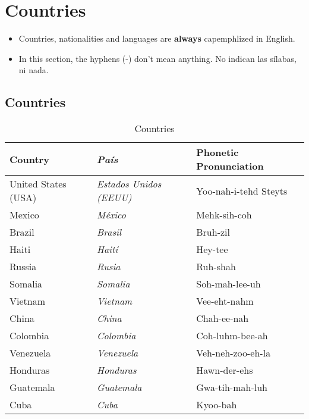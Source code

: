 \chapter{Countries}

\begin{itemize}
	\item Countries, nationalities and languages are \textbf{always}
		capemphlized in English.
	\item In this section, the hyphens (-) don't mean anything.
		No indican las sílabas, ni nada.
\end{itemize}

\section{Countries}


\begin{table}[H]
	\center
	\begin{tabular}{lll}
	\toprule
	\textbf{Country} & \textbf{\emph{Pa\'is}} & \textbf{Phonetic Pronunciation} \\
	\midrule
	United States (USA) & \emph{Estados Unidos (EEUU)} & Yoo-nah-i-tehd Steyts \\
	Mexico & \emph{M\'exico} & Mehk-sih-coh \\
	Brazil & \emph{Brasil} & Bruh-zil \\
	Haiti & \emph{Hait\'i} & Hey-tee \\
	Russia & \emph{Rusia} & Ruh-shah \\
	Somalia & \emph{Somalia} & Soh-mah-lee-uh \\
	Vietnam & \emph{Vietnam} & Vee-eht-nahm \\
	China & \emph{China} & Chah-ee-nah \\
	Colombia & \emph{Colombia} & Coh-luhm-bee-ah \\
	Venezuela & \emph{Venezuela} & Veh-neh-zoo-eh-la \\
	Honduras & \emph{Honduras} & Hawn-der-ehs \\
	Guatemala & \emph{Guatemala} & Gwa-tih-mah-luh \\
	Cuba & \emph{Cuba} & Kyoo-bah \\
	\bottomrule
	\end{tabular}
	\caption{Countries}
\end{table}

